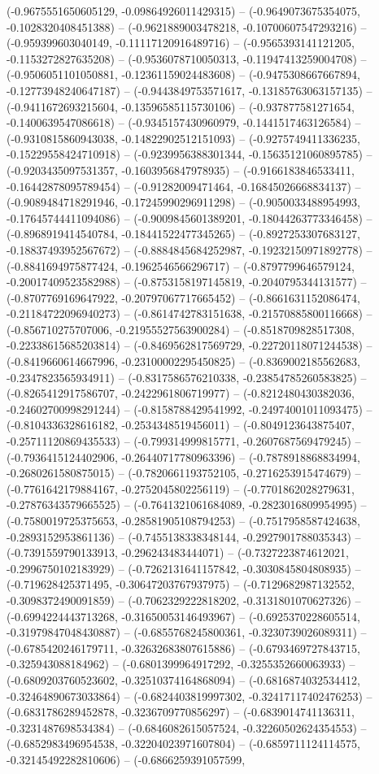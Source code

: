 (-0.9675551650605129, -0.09864926011429315) -- (-0.9649073675354075, -0.1028320408451388) -- (-0.9621889003478218, -0.10700607547293216) -- (-0.959399603040149, -0.11117120916489716) -- (-0.9565393141121205, -0.1153272827635208) -- (-0.9536078710050313, -0.11947413259004708) -- (-0.9506051101050881, -0.12361159024483608) -- (-0.9475308667667894, -0.12773948240647187) -- (-0.9443849753571617, -0.13185763063157135) -- (-0.9411672693215604, -0.13596585115730106) -- (-0.937877581271654, -0.1400639547086618) -- (-0.9345157430960979, -0.1441517463126584) -- (-0.9310815860943038, -0.14822902512151093) -- (-0.9275749411336235, -0.15229558424710918) -- (-0.9239956388301344, -0.15635121060895785) -- (-0.9203435097531357, -0.1603956847978935) -- (-0.9166183846533411, -0.16442878095789454) -- (-0.91282009471464, -0.16845026668834137) -- (-0.9089484718291946, -0.17245990296911298) -- (-0.9050033488954993, -0.17645744411094086) -- (-0.9009845601389201, -0.18044263773346458) -- (-0.8968919414540784, -0.18441522477345265) -- (-0.8927253307683127, -0.18837493952567672) -- (-0.8884845684252987, -0.19232150971892778) -- (-0.8841694975877424, -0.1962546566296717) -- (-0.8797799646579124, -0.20017409523582988) -- (-0.8753158197145819, -0.2040795344131577) -- (-0.8707769169647922, -0.20797067717665452) -- (-0.8661631152086474, -0.21184722096940273) -- (-0.8614742783151638, -0.21570885800116668) -- (-0.856710275707006, -0.21955527563900284) -- (-0.8518709828517308, -0.22338615685203814) -- (-0.8469562817569729, -0.22720118071244538) -- (-0.8419660614667996, -0.23100002295450825) -- (-0.8369002185562683, -0.2347823565934911) -- (-0.8317586576210338, -0.23854785260583825) -- (-0.8265412917586707, -0.2422961806719977) -- (-0.8212480430382036, -0.24602700998291244) -- (-0.8158788429541992, -0.24974001011093475) -- (-0.8104336328616182, -0.2534348519456011) -- (-0.8049123643875407, -0.25711120869435533) -- (-0.799314999815771, -0.2607687569479245) -- (-0.7936415124402906, -0.26440717780963396) -- (-0.7878918868834994, -0.2680261580875015) -- (-0.7820661193752105, -0.2716253915474679) -- (-0.7761642179884167, -0.2752045802256119) -- (-0.7701862028279631, -0.27876343579665525) -- (-0.7641321061684089, -0.2823016809954995) -- (-0.7580019725375653, -0.28581905108794253) -- (-0.7517958587424638, -0.2893152953861136) -- (-0.7455138338348144, -0.2927901788035343) -- (-0.7391559790133913, -0.296243483444071) -- (-0.7327223874612021, -0.2996750102183929) -- (-0.7262131641157842, -0.3030845804808935) -- (-0.719628425371495, -0.30647203767937975) -- (-0.7129682987132552, -0.3098372490091859) -- (-0.7062329222818202, -0.3131801070627326) -- (-0.6994224443713268, -0.31650053146493967) -- (-0.6925370228605514, -0.31979847048430887) -- (-0.6855768245800361, -0.3230739026089311) -- (-0.6785420246179711, -0.32632683807615886) -- (-0.6793469727843715, -0.325943088184962) -- (-0.6801399964917292, -0.3255352660063933) -- (-0.6809203760523602, -0.32510374164868094) -- (-0.6816874032534412, -0.32464890673033864) -- (-0.6824403819997302, -0.32417117402476253) -- (-0.6831786289452878, -0.3236709770856297) -- (-0.6839014741136311, -0.3231487698534384) -- (-0.6846082615057524, -0.32260502624354553) -- (-0.6852983496954538, -0.32204023971607804) -- (-0.6859711124114575, -0.32145492282810606) -- (-0.6866259391057599, 